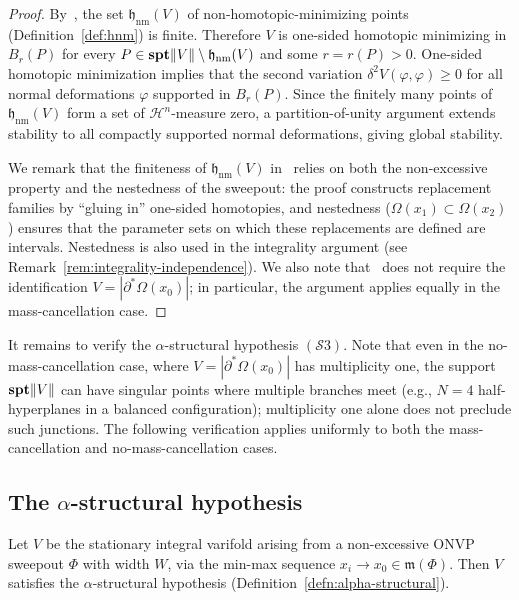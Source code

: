 \begin{proof}
By~\cite[Proposition~3.1]{CLS22}, the set $\mathfrak{h}_{\mathrm{nm}}(V)$ of non-homotopic-minimizing points (Definition~\ref{def:hnm}) is finite. Therefore $V$ is one-sided homotopic minimizing in $B_r(P)$ for every $P \in \mathbf{spt}\|V\| \setminus \mathfrak{h}_{\mathrm{nm}}(V)$ and some $r = r(P) > 0$. One-sided homotopic minimization implies that the second variation $\delta^2 V(\varphi, \varphi) \geq 0$ for all normal deformations $\varphi$ supported in $B_r(P)$. Since the finitely many points of $\mathfrak{h}_{\mathrm{nm}}(V)$ form a set of $\mathcal{H}^n$-measure zero, a partition-of-unity argument extends stability to all compactly supported normal deformations, giving global stability.

We remark that the finiteness of $\mathfrak{h}_{\mathrm{nm}}(V)$ in~\cite[Proposition~3.1]{CLS22} relies on both the non-excessive property and the nestedness of the sweepout: the proof constructs replacement families by ``gluing in'' one-sided homotopies, and nestedness ($\Omega(x_1) \subset \Omega(x_2)$) ensures that the parameter sets on which these replacements are defined are intervals. Nestedness is also used in the integrality argument (see Remark~\ref{rem:integrality-independence}). We also note that~\cite[Proposition~3.1]{CLS22} does not require the identification $V = |\partial^*\Omega(x_0)|$; in particular, the argument applies equally in the mass-cancellation case.
\end{proof}

It remains to verify the $\alpha$-structural hypothesis $(\mathcal{S}3)$. Note that even in the no-mass-cancellation case, where $V = |\partial^*\Omega(x_0)|$ has multiplicity one, the support $\mathbf{spt}\|V\|$ can have singular points where multiple branches meet (e.g., $N = 4$ half-hyperplanes in a balanced configuration); multiplicity one alone does not preclude such junctions. The following verification applies uniformly to both the mass-cancellation and no-mass-cancellation cases.

\subsection{The $\alpha$-structural hypothesis}\label{subsec:alpha-structural}

\begin{theorem}\label{thm:alpha-hypo}
    Let $V$ be the stationary integral varifold arising from a non-excessive ONVP sweepout $\Phi$
    with width $W$, via the min-max sequence $x_i \to x_0 \in \mathfrak{m}(\Phi)$. Then $V$ satisfies the $\alpha$-structural hypothesis (Definition~\ref{defn:alpha-structural}).
\end{theorem}

